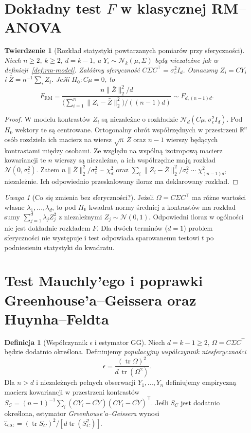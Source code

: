 \documentclass[11pt,a4paper,oneside]{report}
\numberwithin{equation}{chapter}
\theoremstyle{plain}
\newtheorem{twierdzenie}{Twierdzenie}[chapter]
\theoremstyle{definition}
\newtheorem{definicja}{Definicja}[chapter]
\theoremstyle{remark}
\newtheorem{uwaga}{Uwaga}[chapter]
\newcommand{\R}{\mathbb R}
\newcommand{\Normal}{\mathcal N}
\begin{document}
\section{Dokładny test \texorpdfstring{$F$}{F} w klasycznej RM--ANOVA}
\begin{twierdzenie}[Rozkład statystyki powtarzanych pomiarów przy sferyczności]\label{thm:rm-F}
Niech $n\ge2$, $k\ge2$, $d=k-1$, a $Y_i\sim\Normal_k(\mu,\Sigma)$ będą niezależne jak w definicji~\ref{def:rm-model}. Załóżmy sferyczność $C\Sigma C^\top=\sigma_c^2 I_d$. Oznaczmy $Z_i=CY_i$ i $\bar Z=n^{-1}\sum_i Z_i$. Jeśli $H_0:C\mu=0$, to
\[
 F_{\mathrm{RM}}=
 \frac{n\|\bar Z\|_2^2/d}{\bigl(\sum_{i=1}^n\|Z_i-\bar Z\|_2^2\bigr)/((n-1)d)}
 \sim F_{d,(n-1)d}.
\]
\end{twierdzenie}
\begin{proof}
W modelu kontrastów $Z_i$ są niezależne o rozkładzie $\Normal_d(C\mu,\sigma_c^2 I_d)$. Pod $H_0$ wektory te są centrowane. Ortogonalny obrót współrzędnych w przestrzeni $\R^n$ osób rozdziela ich macierz na wiersz $\sqrt n\,\bar Z$ oraz $n-1$ wierszy będących kontrastami między osobami. Ze względu na wspólną izotropową macierz kowariancji te $n$ wierszy są niezależne, a ich współrzędne mają rozkład $\Normal(0,\sigma_c^2)$. Zatem $n\|\bar Z\|_2^2/\sigma_c^2\sim\chi_d^2$ oraz $\sum_i\|Z_i-\bar Z\|_2^2/\sigma_c^2\sim\chi_{(n-1)d}^2$, niezależnie. Ich odpowiednio przeskalowany iloraz ma deklarowany rozkład.
\end{proof}

\begin{uwaga}[Co się zmienia bez sferyczności?]
Jeżeli $\Omega=C\Sigma C^\top$ ma różne wartości własne $\lambda_1,\ldots,\lambda_d$, to pod $H_0$ kwadrat normy średniej z kontrastów ma rozkład sumy $\sum_{j=1}^d\lambda_j Z_j^2$ z niezależnymi $Z_j\sim\Normal(0,1)$. Odpowiedni iloraz w ogólności nie jest dokładnie rozkładem $F$. Dla dwóch terminów ($d=1$) problem sferyczności nie występuje i test odpowiada sparowanemu testowi $t$ po podniesieniu statystyki do kwadratu.
\end{uwaga}

\section{Test Mauchly'ego i poprawki Greenhouse'a--Geissera oraz Huynha--Feldta}
\begin{definicja}[Współczynnik $\epsilon$ i estymator GG]\label{def:gg-epsilon}
Niech $d=k-1\ge2$, $\Omega=C\Sigma C^\top$ będzie dodatnio określona. Definiujemy \emph{populacyjny współczynnik niesferyczności}
\[
 \epsilon=\frac{(\operatorname{tr}\Omega)^2}{d\,\operatorname{tr}(\Omega^2)}.
\]
Dla $n>d$ i niezależnych pełnych obserwacji $Y_1,\ldots,Y_n$ definiujemy empiryczną macierz kowariancji w przestrzeni kontrastów
$S_C=(n-1)^{-1}\sum_i (CY_i-\overline{CY})(CY_i-\overline{CY})^\top$.
Jeśli $S_C$ jest dodatnio określona, estymator \emph{Greenhouse'a--Geissera} wynosi $\widehat\epsilon_{\mathrm{GG}}=(\operatorname{tr}S_C)^2/[d\operatorname{tr}(S_C^2)]$.
\end{definicja}
\end{document}

